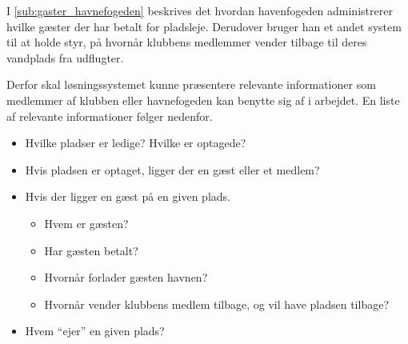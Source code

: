\begin{description}
  I \cref{sub:gaster_havnefogeden} beskrives det hvordan havenfogeden administrerer hvilke gæster der har betalt for pladsleje. Derudover bruger han et andet system til at holde styr, på hvornår klubbens medlemmer vender tilbage til deres vandplads fra udflugter.

  Derfor skal løsningssystemet kunne præsentere relevante informationer som medlemmer af klubben eller havnefogeden kan benytte sig af i arbejdet. En liste af relevante informationer følger nedenfor.


  \begin{itemize}
  \item Hvilke pladser er ledige? Hvilke er optagede?
  \item Hvis pladsen er optaget, ligger der en gæst eller et medlem?
  \item Hvis der ligger en gæst på en given plads.
    \begin{itemize}
      \item Hvem er gæsten?
      \item Har gæsten betalt?
      \item Hvornår forlader gæsten havnen?
      \item Hvornår vender klubbens medlem tilbage, og vil have pladsen tilbage?
    \end{itemize}
  \item Hvem \enquote{ejer} en given plads?
  \end{itemize}

\end{description}
